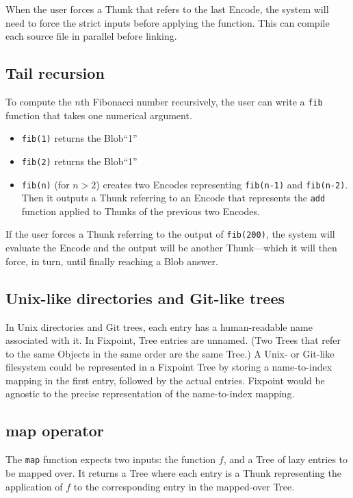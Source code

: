 \documentclass{article}
\newcommand{\blob}{\textrm{Blob}\xspace}
\newcommand{\objects}{\textrm{Object}s\xspace}
\newcommand{\encode}{\textrm{Encode}\xspace}
\newcommand{\thunk}{\textrm{Thunk}\xspace}
\newcommand{\thunks}{\textrm{Thunk}s\xspace}
\newcommand{\encodes}{\textrm{Encode}s\xspace}
\newcommand{\tree}{\textrm{Tree}\xspace}
\newcommand{\trees}{\textrm{Tree}s\xspace}
\begin{document}
When the user forces a \thunk that refers to the last \encode, the
system will need to force the strict inputs before applying the
function. This can compile each source file in parallel before
linking.

\subsection{Tail recursion} To compute the $n$th Fibonacci number
recursively, the user can write a \texttt{fib} function that
takes one numerical argument.
\begin{itemize}[itemsep=0pt]
\item \texttt{fib(1)} returns the \blob ``1''
\item \texttt{fib(2)} returns the \blob ``1''
  \item \texttt{fib(n)} (for $n>2$) creates two \encodes
    representing \texttt{fib(n-1)} and \texttt{fib(n-2)}.
    Then it outputs a \thunk referring to an \encode that represents
    the \texttt{add} function applied to \thunks of the previous two \encodes.
    \end{itemize}

If the user forces a \thunk referring to the output of \texttt{fib(200)}, the system will
evaluate the \encode and the output will be another \thunk---which it will then force, in turn,
until finally reaching a \blob answer.

\subsection{Unix-like directories and Git-like trees}

In Unix directories and Git trees, each entry has a human-readable
name associated with it. In Fixpoint, \tree entries are unnamed. (Two
\trees that refer to the same \objects in the same order are the same
\tree.) A Unix- or Git-like filesystem could be represented in a
Fixpoint \tree by storing a name-to-index mapping in the first entry,
followed by the actual entries. Fixpoint would be agnostic to the
precise representation of the name-to-index mapping.

\subsection{map operator} The \texttt{map} function expects
two inputs: the function $f$, and a \tree of lazy entries to be mapped
over. It returns a \tree where each entry is a \thunk representing the
application of $f$ to the corresponding entry in the mapped-over
\tree.
\end{document}
